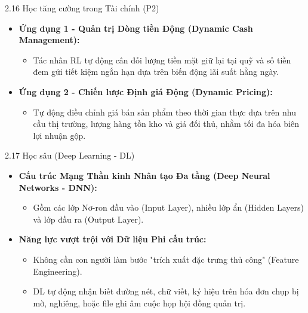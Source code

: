 \documentclass[aspectratio=169]{beamer}
\begin{document}
\begin{frame}{2.16 Học tăng cường trong Tài chính (P2)}
    \begin{itemize}
        \item \textbf{Ứng dụng 1 - Quản trị Dòng tiền Động (Dynamic Cash Management):}
        \begin{itemize}
            \item Tác nhân RL tự động cân đối lượng tiền mặt giữ lại tại quỹ và số tiền đem gửi tiết kiệm ngắn hạn dựa trên biến động lãi suất hằng ngày.
        \end{itemize}
        \item \textbf{Ứng dụng 2 - Chiến lược Định giá Động (Dynamic Pricing):}
        \begin{itemize}
            \item Tự động điều chỉnh giá bán sản phẩm theo thời gian thực dựa trên nhu cầu thị trường, lượng hàng tồn kho và giá đối thủ, nhằm tối đa hóa biên lợi nhuận gộp.
        \end{itemize}
    \end{itemize}
\end{frame}

\begin{frame}{2.17 Học sâu (Deep Learning - DL)}
    \begin{itemize}
        \item \textbf{Cấu trúc Mạng Thần kinh Nhân tạo Đa tầng (Deep Neural Networks - DNN):}
        \begin{itemize}
            \item Gồm các lớp Nơ-ron đầu vào (Input Layer), nhiều lớp ẩn (Hidden Layers) và lớp đầu ra (Output Layer).
        \end{itemize}
        \item \textbf{Năng lực vượt trội với Dữ liệu Phi cấu trúc:}
        \begin{itemize}
            \item Không cần con người làm bước "trích xuất đặc trưng thủ công" (Feature Engineering).
            \item DL tự động nhận biết đường nét, chữ viết, ký hiệu trên hóa đơn chụp bị mờ, nghiêng, hoặc file ghi âm cuộc họp hội đồng quản trị.
        \end{itemize}
    \end{itemize}
\end{frame}

\end{document}
